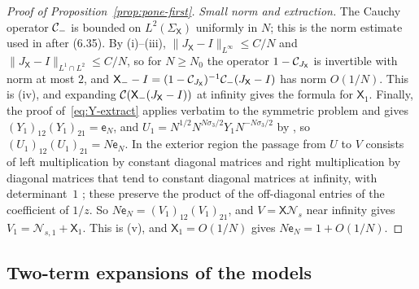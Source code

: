 \begin{proof}[Proof of Proposition~\textup{\ref{prop:pone-first}}]
\emph{Small norm and extraction.} The Cauchy operator $\mathcal{C}_-$ is bounded on $L^2(\Sigma_{\mathsf X})$ uniformly in $N$; this
is the norm estimate used in \cite{WLXZ} after (6.35). By (i)--(iii), $\|J_{\mathsf X}-I\|_{L^\infty}\le C/N$ and
$\|J_{\mathsf X}-I\|_{L^1\cap L^2}\le C/N$, so for $N\ge N_0$ the operator $1-\mathcal{C}_{J_{\mathsf X}}$ is invertible with norm at
most $2$, and $\mathsf X_--I=(1-\mathcal{C}_{J_{\mathsf X}})^{-1}\mathcal{C}_-(J_{\mathsf X}-I)$ has norm $O(1/N)$. This is (iv), and
expanding $\mathcal{C}(\mathsf X_-(J_{\mathsf X}-I))$ at infinity gives the formula for $\mathsf X_1$. Finally, the proof of~\eqref{eq:Y-extract} applies verbatim to the symmetric problem and gives
$(Y_1)_{12}(Y_1)_{21}=\mathsf e_N$, and $U_1=N^{1/2}N^{N\sigma_3/2}Y_1N^{-N\sigma_3/2}$
by \cite[(3.1)]{WLXZ}, so $(U_1)_{12}(U_1)_{21}=N\mathsf e_N$. In the exterior region the passage from $U$ to $V$ consists of
left multiplication by constant diagonal matrices and right multiplication by diagonal matrices that tend to constant
diagonal matrices at infinity, with determinant~$1$ \cite[(4.1), (5.1)]{WLXZ}; these preserve the product of the
off-diagonal entries of the coefficient of $1/z$. So $N\mathsf e_N=(V_1)_{12}(V_1)_{21}$, and $V=\mathsf X\mathcal N_s$ near
infinity gives $V_1=\mathcal N_{s,1}+\mathsf X_1$. This is (v), and $\mathsf X_1=O(1/N)$ gives $N\mathsf e_N=1+O(1/N)$.
\end{proof}

\subsection{Two-term expansions of the models}\label{app:pone-models}

